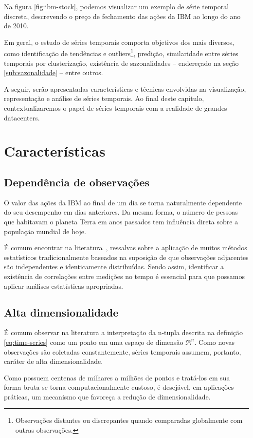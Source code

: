 Na figura \ref{fig:ibm-stock}, podemos visualizar um exemplo de série temporal discreta, descrevendo o preço de fechamento das ações da IBM ao longo do ano de 2010.

Em geral, o estudo de séries temporais comporta objetivos dos mais diversos, como identificação de tendências e outliers\footnote{Observações distantes ou discrepantes quando comparadas globalmente com outras observações.}, predição, similaridade entre séries temporais por clusterização, existência de sazonalidades -- endereçado na seção \ref{sub:sazonalidade} -- entre outros.

A seguir, serão apresentadas características e técnicas envolvidas na visualização, representação e análise de séries temporais. Ao final deste capítulo, contextualizaremos o papel de séries temporais com a realidade de grandes datacenters.

\section{Características}
\subsection{Dependência de observações}
O valor das ações da IBM ao final de um dia se torna naturalmente dependente do seu desempenho em dias anteriores. Da mesma forma, o número de pessoas que habitavam o planeta Terra em anos passados tem influência direta sobre a população mundial de hoje.

É comum encontrar na literatura~\cite{timeseriesr}, ressalvas sobre a aplicação de muitos métodos estatísticos tradicionalmente baseados na suposição de que observações adjacentes são independentes e identicamente distribuídas. Sendo assim, identificar a existência de correlações entre medições no tempo é essencial para que possamos aplicar análises estatísticas apropriadas.

\subsection{Alta dimensionalidade}
\label{sub:alta-dimensionalidade}
É comum observar na literatura a interpretação da n-tupla descrita na definição \ref{eq:time-series} como um ponto em uma espaço de dimensão $\Re^n$. Como novas observações são coletadas constantemente, séries temporais assumem, portanto, caráter de alta dimensionalidade.

Como possuem centenas de milhares a milhões de pontos e tratá-los em sua forma bruta se torna computacionalmente custoso, é desejável, em aplicações práticas, um mecanismo que favoreça a redução de dimensionalidade.

